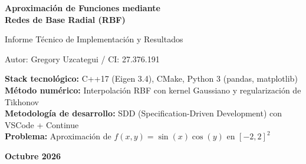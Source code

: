 \documentclass[12pt,a4paper]{article}
\theoremstyle{definition}
\newcommand{\vect}[1]{\mathbf{#1}}
\begin{document}
\begin{titlepage}
    \centering
    \vspace*{2cm}
    {\Huge\bfseries Aproximaci\'{o}n de Funciones mediante\\[0.3cm] Redes de Base Radial (RBF)\par}
    \vspace{1.5cm}
    {\Large Informe T\'{e}cnico de Implementaci\'{o}n y Resultados\par}
    \vspace{2cm}
    {\Large Autor: Gregory Uzcategui / CI: 27.376.191 \par}
    \vspace{2cm}
    {\large
    \textbf{Stack tecnol\'{o}gico:} C++17 (Eigen 3.4), CMake, Python 3 (pandas, matplotlib)\\[0.5cm]
    \textbf{M\'{e}todo num\'{e}rico:} Interpolaci\'{o}n RBF con kernel Gaussiano y regularizaci\'{o}n de Tikhonov\\[0.5cm]
    \textbf{Metodolog\'{i}a de desarrollo:} SDD (Specification-Driven Development) con VSCode + Continue\\[0.5cm]
    \textbf{Problema:} Aproximaci\'{o}n de $f(x, y) = \sin(x)\cos(y)$ en $[-2, 2]^2$
    \par}
    \vfill
    {\large \textbf{Octubre 2026}}
\end{titlepage} 

\begin{abstract}
\noindent
La implementaci\'{o}n de un interpolador de \textbf{Redes de Base Radial (RBF)} para aproximar la funci\'{o}n objetivo $f(x, y) = \sin(x)\cos(y)$ en el dominio $[-2, 2]^2$. Se desarroll\'{o} el solver en C++17 utilizando la librer\'{i}a Eigen para la construcci\'{o}n de la matriz de Gram $\Phi$ y la resoluci\'{o}n del sistema lineal regularizado $(\Phi + \lambda I)\vect{w} = \vect{y}$ mediante descomposici\'{o}n LDLT. Se estudi\'{o} el efecto del par\'{a}metro de forma $\epsilon$ en tres escenarios ($\epsilon = 0.5, 1.5, 5.0$), evidenciando el trade-off entre suavidad de la superficie, precisi\'{o}n de interpolaci\'{o}n y estabilidad num\'{e}rica (n\'{u}mero de condici\'{o}n). La implementaci\'{o}n sigui\'{o} la metodolog\'{i}a \textbf{Specification-Driven Development (SDD)}, utilizando VSCode con la extensi\'{o}n Continue para generar m\'{o}dulos a partir de especificaciones formales en Markdown.
\end{abstract}

\tableofcontents
\newpage
\end{document}
